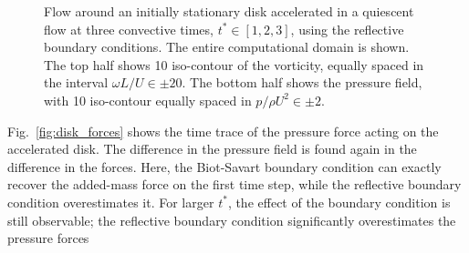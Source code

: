 \documentclass[preprint,12pt]{elsarticle}
\begin{document}
\begin{figure}
\begin{subfigure}{.33\textwidth}
    \end{subfigure}
    \caption{Flow around an initially stationary disk accelerated in a quiescent flow at three convective times, $t^*\in [1,2,3]$, using the reflective boundary conditions. The entire computational domain is shown. The top half shows 10 iso-contour of the vorticity, equally spaced in the interval $\omega L/U\in\pm20$. The bottom half shows the pressure field, with 10 iso-contour equally spaced in $p/\rho U^2\in\pm2$.}
    \label{fig:disk_flow_1}
\end{figure}


Fig.~\ref{fig:disk_forces} shows the time trace of the pressure force acting on the accelerated disk. The difference in the pressure field is found again in the difference in the forces. Here, the Biot-Savart boundary condition can exactly recover the added-mass force on the first time step, while the reflective boundary condition overestimates it. For larger $t^*$, the effect of the boundary condition is still observable; the reflective boundary condition significantly overestimates the pressure forces
\end{document}
